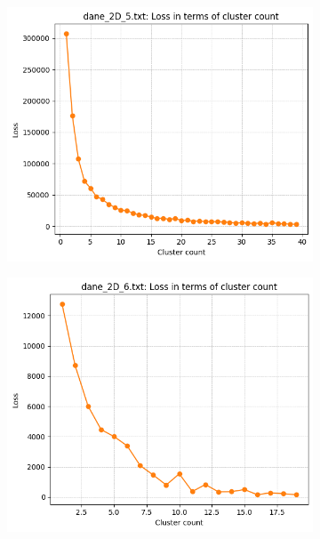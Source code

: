 \documentclass[polish,12pt,a4paper]{extarticle}
\begin{document}
\begin{figure}[h!]
\begin{subfigure}[b]{0.30\textwidth}
    \end{subfigure}
    \hfill
    \begin{subfigure}[b]{0.30\textwidth}
        \includegraphics[width=\linewidth]{img/elbow/data5.png}
        \captionsetup{labelformat=empty}
    \end{subfigure}
    \hfill
    \begin{subfigure}[b]{0.30\textwidth}
        \includegraphics[width=\linewidth]{img/elbow/data6.png}
        \captionsetup{labelformat=empty}
    \end{subfigure}

\end{figure}
\end{document}
